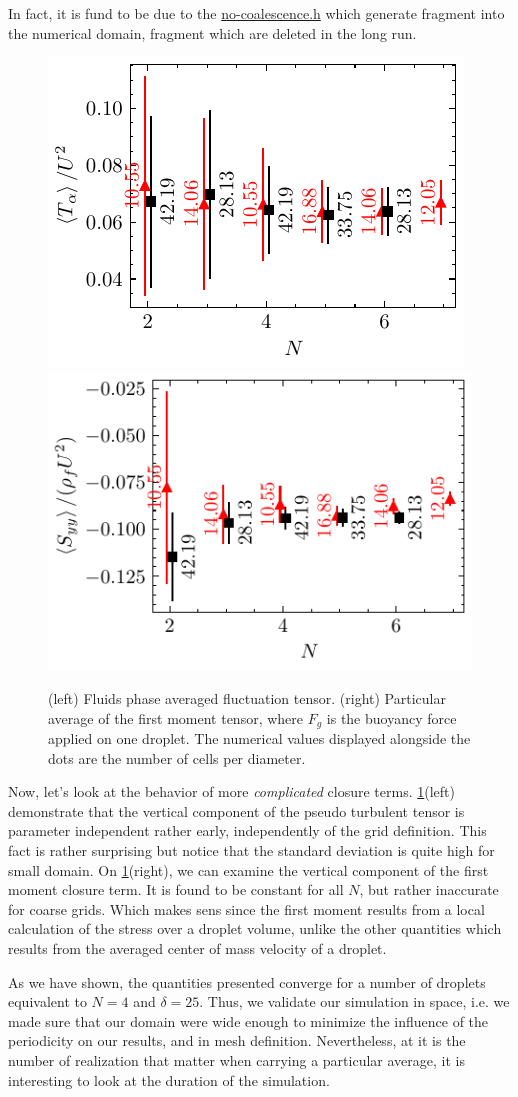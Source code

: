In fact, it is fund to be due to the \href{http://basilisk.fr/sandbox/fintzin/Rising-Suspension/no-coalescence.h}{no-coalescence.h} which generate fragment into the numerical domain, fragment which are deleted in the long run. 
\begin{figure}[h!]
    \centering
    \includegraphics[height= 0.3\textwidth]{image/VALIDATION/N_and_delta/PA_UpUp.pdf}
    \includegraphics[height= 0.3\textwidth]{image/VALIDATION/N_and_delta/Mh.pdf}
    \caption{(left) Fluids phase averaged fluctuation tensor.
            (right) Particular average of the first moment tensor, where $F_g$ is the buoyancy force applied on one droplet. 
            The numerical values displayed alongside the dots are the number of cells per diameter.}
    \label{fig:VALIDATION_Nd_2}
\end{figure}
Now, let's look at the behavior of more \textit{complicated} closure terms. 
\ref{fig:VALIDATION_Nd_2}(left) demonstrate that the vertical component of the pseudo turbulent tensor is parameter independent rather early, independently of the grid definition. 
This fact is rather surprising but notice that the standard deviation is quite high for small domain. 
On \ref{fig:VALIDATION_Nd_2}(right), we can examine the vertical component of the first moment closure term. 
It is found to be constant for all $N$, but rather inaccurate for coarse grids. 
Which makes sens since the first moment results from a local calculation of the stress over a droplet volume, unlike the other quantities which results from the averaged center of mass velocity of a droplet. 

As we have shown, the quantities presented converge for a number of droplets equivalent to $N = 4$ and $\delta = 25$. 
Thus, we validate our simulation in space, i.e. we made sure that our domain were wide enough to minimize the influence of the periodicity on our results, and in mesh definition. 
Nevertheless, at it is the number of realization that matter when carrying a particular average, it is interesting to look at the duration of the simulation.



